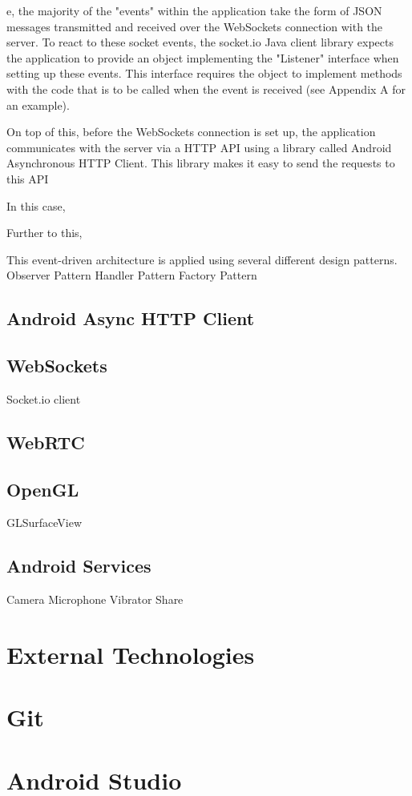 \documentclass[]{report}
\begin{document}
			e, the majority of the "events" within the application take the form of JSON messages transmitted and received over the WebSockets connection with the server. To react to these socket events, the socket.io Java client library expects the application to provide an object implementing the "Listener" interface when setting up these events. This interface requires the object to implement methods with the code that is to be called when the event is received (see Appendix A for an example).
			
			On top of this, before the WebSockets connection is set up, the application communicates with the server via a HTTP API using a library called Android Asynchronous HTTP Client. This library makes it easy to send the requests to this API 
						
			In this case, 

 			Further to this, 
			
		This event-driven architecture is applied using several different design patterns.
		Observer Pattern
		Handler Pattern
		Factory Pattern
		\subsection{Android Async HTTP Client}
		\subsection{WebSockets}
		Socket.io client
		\subsection{WebRTC}
		\subsection{OpenGL}
		GLSurfaceView
		\subsection{Android Services}
		Camera
		Microphone
		Vibrator
		Share
	\section{External Technologies}
		\section{Git}
		\section{Android Studio}
\end{document}
